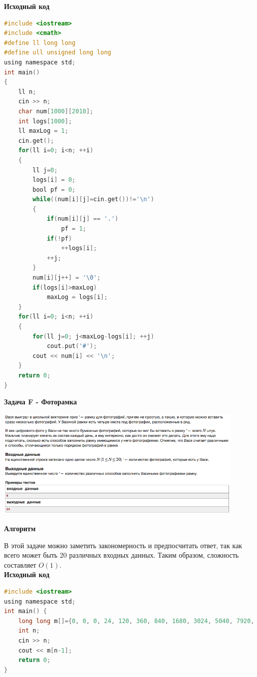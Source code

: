 \documentclass[a4paper,12pt]{article}
\begin{document}
\textbf{{\large Исходный код}}
\begin{lstlisting}[language=C]
#include <iostream>
#include <cmath>
#define ll long long
#define ull unsigned long long
using namespace std;
int main()
{
    ll n;
    cin >> n;
    char num[1000][2010];
    int logs[1000];
    ll maxLog = 1;
    cin.get();
    for(ll i=0; i<n; ++i)
    {
        ll j=0;
        logs[i] = 0;
        bool pf = 0;
        while((num[i][j]=cin.get())!='\n')
        {
            if(num[i][j] == '.')
                pf = 1;
            if(!pf)
                ++logs[i];
            ++j;
        }
        num[i][j++] = '\0';
        if(logs[i]>maxLog)
            maxLog = logs[i];
    }
    for(ll i=0; i<n; ++i)
    {
        for(ll j=0; j<maxLog-logs[i]; ++j)
            cout.put('#');
        cout << num[i] << '\n';
    }
    return 0;
}
\end{lstlisting}


\newpage
\textbf{{\large Задача F - Фоторамка}}

\begin{center}
\includegraphics[width=0.9\textwidth]{CT_school_nn/CT_school_nn_F.png}\\ [1cm]
\end{center}

\textbf{{\large Алгоритм}}

В этой задаче можно заметить закономерность и предпосчитать ответ, так как всего может быть 20 различных входных данных. Таким образом, сложность составляет $O(1)$. \\

\textbf{{\large Исходный код}} \\
\begin{lstlisting}[language=C]
#include <iostream>
using namespace std;
int main() {
    long long m[]={0, 0, 0, 24, 120, 360, 840, 1680, 3024, 5040, 7920, 11880, 17160, 24024, 32760, 43680, 57120, 73440, 93024, 116280};
    int n;
    cin >> n;
    cout << m[n-1];
    return 0;
}
\end{lstlisting}
\end{document}

